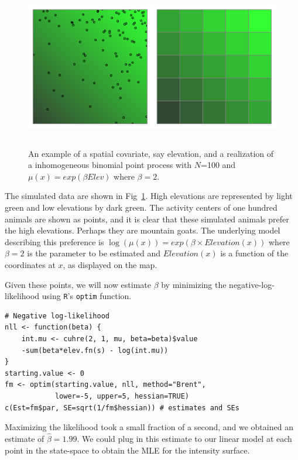 \begin{figure}
\centering
\includegraphics[width=5in,height=2.5in]{Ch11/figs/heteroPlots}
\label{ch9:fig:hetero}
\caption{An example of a spatial covariate, say elevation, and a
  realization of a inhomogeneous binomial point process with $N$=100
  and $\mu(x) = exp(\beta Elev)$ where $\beta=2$.}
\end{figure}

The simulated data are shown in Fig~\ref{ch9:fig:hetero}. High elevations
are represented by light green and low elevations by dark green. The
activity centers of one hundred animals are shown as
points, and it is clear that these simulated animals prefer the high
elevations.  Perhaps they are mountain goats. The underlying model describing this preference is
$\log(\mu(x)) = exp(\beta \times Elevation(x))$
where $\beta=2$ is the parameter to be estimated and $Elevation(x)$
is a function of the coordinates at $x$, as displayed on the map.

Given these points, we will now estimate $\beta$ by minimizing the
negative-log-likelihood using \verb+R+'s \verb+optim+ function.

\begin{small}
\begin{verbatim}
# Negative log-likelihood
nll <- function(beta) {
    int.mu <- cuhre(2, 1, mu, beta=beta)$value
    -sum(beta*elev.fn(s) - log(int.mu))
}
starting.value <- 0
fm <- optim(starting.value, nll, method="Brent",
            lower=-5, upper=5, hessian=TRUE)
c(Est=fm$par, SE=sqrt(1/fm$hessian)) # estimates and SEs
\end{verbatim}
\end{small}


Maximizing the likelihood took a small fraction of a second, and we
obtained an estimate of $\hat{\beta}=1.99$. We could plug in
this estimate to our linear model at each point in the state-space to
obtain the MLE for the intensity surface.


